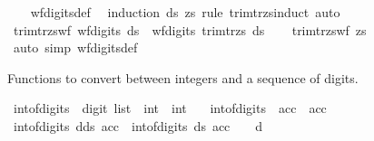 \begin{isabellebody}
%
\isadelimproof
\ \ %
\endisadelimproof
%
\isatagproof
{}\isamarkupfalse%
\ wf{\isacharunderscore}{\kern0pt}digits{\isacharunderscore}{\kern0pt}def\ \isamarkupfalse%
\ {\isacharparenleft}{\kern0pt}induction\ ds\ zs\ rule{\isacharcolon}{\kern0pt}\ trim{\isacharunderscore}{\kern0pt}tr{\isacharunderscore}{\kern0pt}zs{\isacharprime}{\kern0pt}{\isachardot}{\kern0pt}induct{\isacharparenright}{\kern0pt}\ auto%
\endisatagproof
{\isafoldproof}%
%
\isadelimproof
\isanewline
%
\endisadelimproof
\isanewline
{}\isamarkupfalse%
\ trim{\isacharunderscore}{\kern0pt}tr{\isacharunderscore}{\kern0pt}zs{\isacharunderscore}{\kern0pt}wf{\isacharcolon}{\kern0pt}\ {\isachardoublequoteopen}wf{\isacharunderscore}{\kern0pt}digits\ ds\ {\isasymLongrightarrow}\ wf{\isacharunderscore}{\kern0pt}digits\ {\isacharparenleft}{\kern0pt}trim{\isacharunderscore}{\kern0pt}tr{\isacharunderscore}{\kern0pt}zs\ ds{\isacharparenright}{\kern0pt}{\isachardoublequoteclose}\isanewline
%
\isadelimproof
\ \ %
\endisadelimproof
%
\isatagproof
{}\isamarkupfalse%
\ trim{\isacharunderscore}{\kern0pt}tr{\isacharunderscore}{\kern0pt}zs{\isacharprime}{\kern0pt}{\isacharunderscore}{\kern0pt}wf{\isacharbrackleft}{\kern0pt}\ zs{\isacharequal}{\kern0pt}{\isachardoublequoteopen}{\isacharbrackleft}{\kern0pt}{\isacharbrackright}{\kern0pt}{\isachardoublequoteclose}{\isacharbrackright}{\kern0pt}\ \isamarkupfalse%
\ {\isacharparenleft}{\kern0pt}auto\ simp{\isacharcolon}{\kern0pt}\ wf{\isacharunderscore}{\kern0pt}digits{\isacharunderscore}{\kern0pt}def{\isacharparenright}{\kern0pt}%
\endisatagproof
{\isafoldproof}%
%
\isadelimproof
%
\endisadelimproof
%
\begin{isamarkuptext}%
Functions to convert between integers and a sequence of digits.%
\end{isamarkuptext}\isamarkuptrue%
\isamarkupfalse%
\ int{\isacharunderscore}{\kern0pt}of{\isacharunderscore}{\kern0pt}digits\ {\isacharcolon}{\kern0pt}{\isacharcolon}{\kern0pt}\ {\isachardoublequoteopen}digit\ list\ {\isasymRightarrow}\ int\ {\isasymRightarrow}\ int{\isachardoublequoteclose}\ \isanewline
\ \ {\isachardoublequoteopen}int{\isacharunderscore}{\kern0pt}of{\isacharunderscore}{\kern0pt}digits\ {\isacharbrackleft}{\kern0pt}{\isacharbrackright}{\kern0pt}\ acc\ {\isacharequal}{\kern0pt}\ acc{\isachardoublequoteclose}\isanewline
{\isacharbar}{\kern0pt}\ {\isachardoublequoteopen}int{\isacharunderscore}{\kern0pt}of{\isacharunderscore}{\kern0pt}digits\ {\isacharparenleft}{\kern0pt}d{\isacharhash}{\kern0pt}ds{\isacharparenright}{\kern0pt}\ acc\ {\isacharequal}{\kern0pt}\ int{\isacharunderscore}{\kern0pt}of{\isacharunderscore}{\kern0pt}digits\ ds\ {\isacharparenleft}{\kern0pt}acc\ {\isacharasterisk}{\kern0pt}\ {}{}\ {\isacharplus}{\kern0pt}\ d{\isacharparenright}{\kern0pt}{\isachardoublequoteclose}\isanewline

\end{isabellebody}
